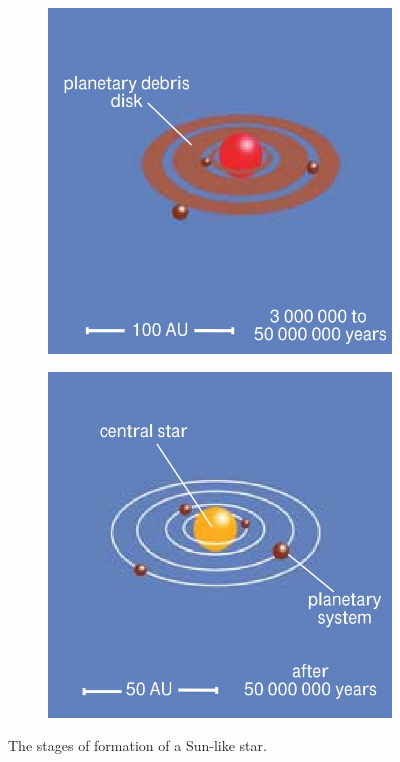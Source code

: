 \begin{figure}[h]
\begin{subfigure}[c]{0.3\textwidth}
		\label{fig:star-formation:4}
	\end{subfigure}\hfill%
	\begin{subfigure}[c]{0.3\textwidth}
		\includegraphics[width=\textwidth]{img/sf5-1}
		\label{fig:star-formation:5}
	\end{subfigure}\hfill%
	\begin{subfigure}[c]{0.3\textwidth}
		\includegraphics[width=\textwidth]{img/sf6-1}
		\label{fig:star-formation:6}
	\end{subfigure}%
\caption{The stages of formation of a Sun-like star.}
\label{fig:star-formation}
\end{figure}

